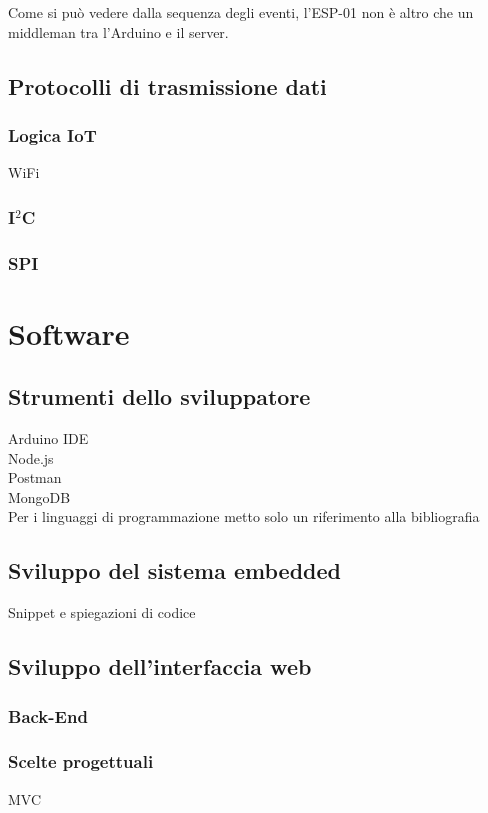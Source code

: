 \documentclass[12pt]{report}
\begin{document}
Come si può vedere dalla sequenza degli eventi, l'ESP-01 non è altro che un middleman tra l'Arduino e il server.
%
\section{Protocolli di trasmissione dati}
%


%
\subsection{Logica IoT}
%
WiFi

%
\subsection{I$^2$C}\label{sec:i2c}
%

%
\subsection{SPI}\label{sec:spi}
% 
\chapter{Software}
\label{cap3}
%
%
%
\section{Strumenti dello sviluppatore}
Arduino IDE
\\
Node.js
\\
Postman
\\
MongoDB 
\\
Per i linguaggi di programmazione metto solo un riferimento alla bibliografia
%
%
\section{Sviluppo del sistema embedded}
Snippet e spiegazioni di codice
\\

%
%
\section{Sviluppo dell'interfaccia web}
%
\subsection{Back-End}
\subsection*{Scelte progettuali}
MVC
\end{document}

